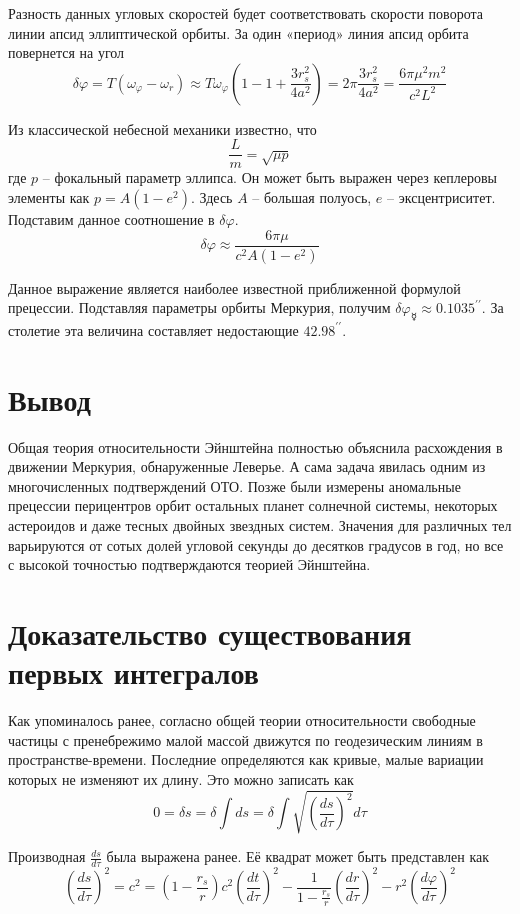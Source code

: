 \documentclass[14pt, a4paper]{report}
\begin{document}
Разность данных угловых скоростей будет соответствовать скорости поворота линии апсид эллиптической орбиты. За один «период» линия апсид орбита повернется на угол
\[\delta\varphi=T(\omega_\varphi-\omega_r)\approx T\omega_\varphi\left(1-1+\frac{3r_s^2}{4a^2}\right)=2\pi\frac{3r_s^2}{4a^2}=\frac{6\pi\mu^2 m^2}{c^2 L^2}\]

Из классической небесной механики известно, что
\[\frac{L}{m}=\sqrt{\mu p}\]
где $p$ -- фокальный параметр эллипса. Он может быть выражен через кеплеровы элементы как $p=A(1-e^2)$. Здесь $A$ -- большая полуось, $e$ -- эксцентриситет. Подставим данное соотношение в $\delta\varphi$.
\[\delta\varphi\approx\frac{6\pi\mu}{c^2 A(1-e^2)}\]

Данное выражение является наиболее известной приближенной формулой прецессии. Подставляя параметры орбиты Меркурия, получим $\delta\varphi_{\mercury}\approx0.1035^{\prime\prime}$. За столетие эта величина составляет недостающие $42.98^{\prime\prime}$.

\section{Вывод}

Общая теория относительности Эйнштейна полностью объяснила расхождения в движении Меркурия, обнаруженные Леверье. А сама задача явилась одним из многочисленных подтверждений ОТО. Позже были измерены аномальные прецессии перицентров орбит остальных планет солнечной системы, некоторых астероидов и даже тесных двойных звездных систем. Значения для различных тел варьируются от сотых долей угловой секунды до десятков градусов в год, но все с высокой точностью подтверждаются теорией Эйнштейна.

\newpage

\section{Доказательство существования первых интегралов}

Как упоминалось ранее, согласно общей теории относительности свободные частицы с пренебрежимо малой массой движутся по геодезическим линиям в пространстве-времени. Последние определяются как кривые, малые вариации которых не изменяют их длину. Это можно записать как
\[0=\delta s=\delta\int ds=\delta\int\sqrt{\left(\frac{ds}{d\tau}\right)^2}d\tau\]

Производная $\frac{ds}{d\tau}$ была выражена ранее. Её квадрат может быть представлен как
\[\left(\frac{ds}{d\tau}\right)^2=c^2=\left(1-\frac{r_s}{r}\right)c^2\left(\frac{dt}{d\tau}\right)^2-\frac{1}{1-\frac{r_s}{r}}\left(\frac{dr}{d\tau}\right)^2-r^2\left(\frac{d\varphi}{d\tau}\right)^2\]
\end{document}
